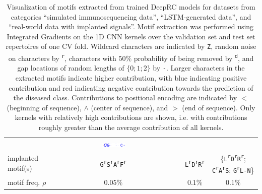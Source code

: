 \documentclass[oneside]{book}
\begin{document}
\begin{table}[htp]
\begin{center}
{\begin{tabular}{lcccc}
            & \includegraphics[angle=0,width=0.2\textwidth]{figures/extracted_motifs/implanted_p001_multiple_motifs_kernel_intgrds.pdf}\\
            implanted motif(s) & \texttt{G\textsuperscript{r}S\textsuperscript{r}A\textsuperscript{r}F\textsuperscript{r}}%
            & & \texttt{L\textsuperscript{r}D\textsuperscript{r}R\textsuperscript{r}} & \{\texttt{L\textsuperscript{r}D\textsuperscript{r}R\textsuperscript{r}}; \texttt{C\textsuperscript{r}A\textsuperscript{r}S}; \texttt{G\textsuperscript{r}L-N}\} \\
            motif freq. $\rho$ & $0.05\%$ & & $0.1\%$ & $0.1\%$ \\
            \bottomrule
        \end{tabular}
                    }%
        \endgroup
    \end{center}%
    \caption[Visualization of extracted motifs]{Visualization of motifs extracted from trained DeepRC models for datasets from categories
    ``simulated immunosequencing data'',
    ``LSTM-generated data'', and
    ``real-world data with implanted signals''.
    Motif extraction was performed using Integrated Gradients on the 1D CNN kernels over the validation set and test set repertoires of one CV fold.
    Wildcard characters are indicated by \texttt{Z},
    random noise on characters by \texttt{\textsuperscript{r}},
    characters with $50\%$ probability of being removed by \texttt{\textsuperscript{d}}, and
    gap locations of random lengths of $\{0;1;2\}$ by \texttt{-}.
    Larger characters in the extracted motifs indicate higher contribution,
    with blue indicating positive contribution and red indicating negative contribution towards the prediction of the diseased class.
    Contributions to positional encoding are indicated by \texttt{$<$} (beginning of sequence), \texttt{$\wedge$} (center of sequence), and \texttt{$>$} (end of sequence).
    Only kernels with relatively high contributions are shown,
    i.e. with contributions roughly greater than the average contribution of all kernels.
    \label{tab:simulations_kernel_ig}}%
\end{table}
\end{document}
